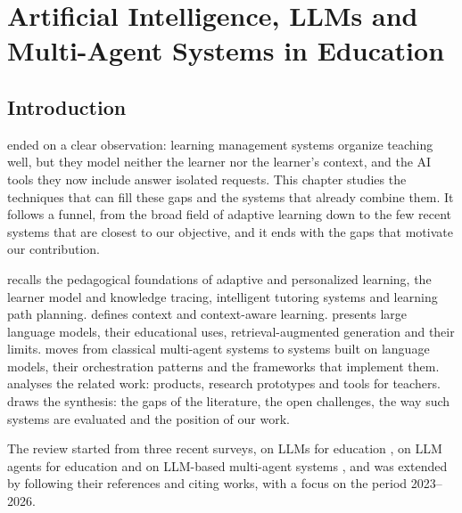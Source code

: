 \chapter{Artificial Intelligence, LLMs and Multi-Agent Systems in Education}
\label{chap-sota}

\section*{Introduction}

 ended on a clear observation: learning management systems
organize teaching well, but they model neither the learner nor the
learner's context, and the AI tools they now include answer isolated
requests. This chapter studies the techniques that can fill these gaps and
the systems that already combine them. It follows a funnel, from the broad
field of adaptive learning down to the few recent systems that are closest
to our objective, and it ends with the gaps that motivate our
contribution.

 recalls the pedagogical foundations of adaptive and
personalized learning, the learner model and knowledge tracing,
intelligent tutoring systems and learning path planning. 
defines context and context-aware learning.  presents large
language models, their educational uses, retrieval-augmented generation
and their limits.  moves from classical multi-agent systems
to systems built on language models, their orchestration patterns and the
frameworks that implement them.  analyses the
related work: products, research prototypes and tools for teachers.
 draws the synthesis: the gaps of the literature, the
open challenges, the way such systems are evaluated and the position of
our work.

The review started from three recent surveys, on LLMs for education
\cite{wang2024llm4edu}, on LLM agents for education \cite{chu2025agents}
and on LLM-based multi-agent systems \cite{guo2024mas}, and was extended
by following their references and citing works, with a focus on the period
2023--2026.

